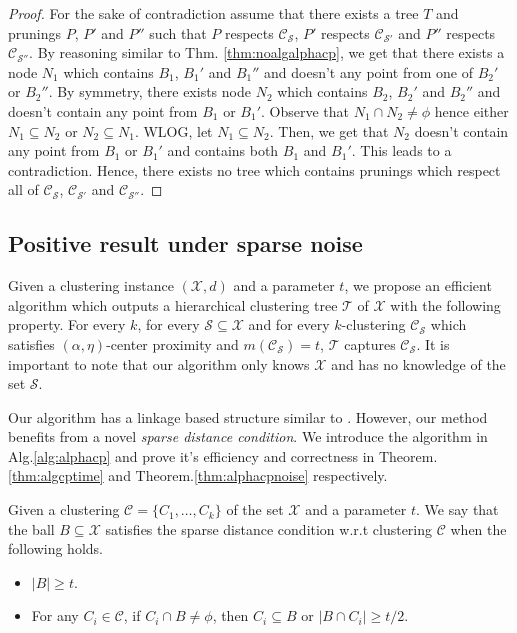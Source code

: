 \documentclass[anon,12pt]{colt2016} %
\newcommand{\mc}{\mathcal}
\begin{document}
\begin{proof}
For the sake of contradiction assume that there exists a tree $T$ and prunings $P$, $P'$ and $P''$ such that $P$ respects $\mc C_{\mc S}$, $P'$ respects $\mc C_{\mc S'}$ and $P''$ respects $\mc C_{\mc S''}$. By reasoning similar to Thm. \ref{thm:noalgalphacp}, we get that there exists a node $N_1$ which contains $B_1$, $B_1'$ and $B_1''$ and doesn't any point from one of $B_2'$ or $B_2''$. By symmetry, there exists node $N_2$ which contains $B_2$, $B_2'$ and $B_2''$ and doesn't contain any point from $B_1$ or $B_1'$. Observe that $N_1 \cap N_2 \neq \phi$ hence either $N_1 \subseteq N_2$ or $N_2 \subseteq N_1$. WLOG, let $N_1 \subseteq N_2$. Then, we get that $N_2$ doesn't contain any point from $B_1$ or $B_1'$ and contains both $B_1$ and $B_1'$. This leads to a contradiction. Hence, there exists no tree which contains prunings which respect all of $\mc C_{\mc S}$, $\mc C_{\mc S'}$ and $\mc C_{\mc S''}$.
\end{proof}


\subsection{Positive result under sparse noise}
\label{section:positiveResultSparseNoise}

Given a clustering instance $(\mc X, d)$ and a parameter $t$, we propose an efficient algorithm which outputs a hierarchical clustering tree $\mc T$ of $\mc X$ with the following property. For every $k$, for every $\mc S \subseteq \mc X$ and for every $k$-clustering $\mc C_{\mc S}$ which satisfies $(\alpha, \eta)$-center proximity and $m(\mc C_{\mc S}) = t$, $\mc T$ captures $\mc C_{\mc S}$. It is important to note that our algorithm only knows $\mc X$ and has no knowledge of the set $\mc S$.


Our algorithm has a linkage based structure similar to \cite{balcan2012clustering}. However, our method benefits from a novel {\it sparse distance condition}. We introduce the algorithm in Alg.\ref{alg:alphacp} and prove it's efficiency and correctness in Theorem. \ref{thm:algcptime} and Theorem.\ref{thm:alphacpnoise} respectively. 

\begin{definition}
	 Given a clustering $\mc C = \{C_1,\ldots,C_k\}$ of the set $\mc X$ and a parameter $t$. We say that the ball $B \subseteq \mc X$ satisfies the sparse distance condition w.r.t clustering $\mc C$ when the following holds.
\begin{itemize}[noitemsep, leftmargin=*]
\item $|B| \ge t$.
\item For any $C_i \in \mc C$, if $C_i \cap B \neq \phi$, then $C_i \subseteq B$ or $|B \cap C_i| \ge t/2$.
\end{itemize}
\end{definition}
\end{document}
